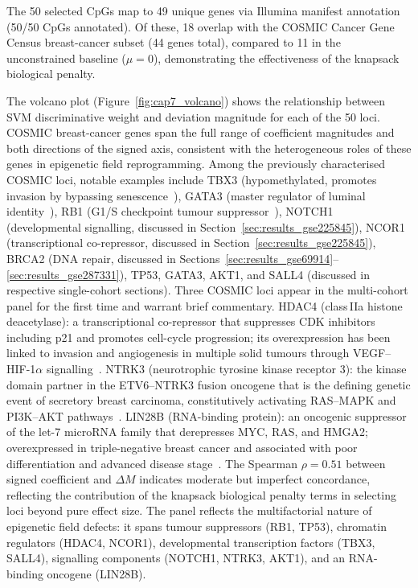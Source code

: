 The 50 selected CpGs map to 49 unique genes via Illumina manifest
annotation (50/50 CpGs annotated).
Of these, 18 overlap with the COSMIC Cancer Gene Census breast-cancer subset
(44 genes total), compared to 11 in the unconstrained baseline ($\mu = 0$),
demonstrating the effectiveness of the knapsack biological penalty.

The volcano plot (Figure~\ref{fig:cap7_volcano}) shows the relationship between
SVM discriminative weight and deviation magnitude for each of the 50 loci.
COSMIC breast-cancer genes span the full range of coefficient magnitudes and
both directions of the signed axis, consistent with the heterogeneous roles of
these genes in epigenetic field reprogramming.
Among the previously characterised COSMIC loci, notable examples include
TBX3 (hypomethylated, promotes invasion by bypassing senescence~\cite{fillmore2010tbx3}),
GATA3 (master regulator of luminal identity~\cite{asselin2007gata3}),
RB1 (G1/S checkpoint tumour suppressor~\cite{cancer2012comprehensive}),
NOTCH1 (developmental signalling, discussed in Section~\ref{sec:results_gse225845}),
NCOR1 (transcriptional co-repressor, discussed in Section~\ref{sec:results_gse225845}),
BRCA2 (DNA repair, discussed in Sections~\ref{sec:results_gse69914}--\ref{sec:results_gse287331}),
TP53, GATA3, AKT1, and SALL4 (discussed in respective single-cohort sections).
Three COSMIC loci appear in the multi-cohort panel for the first time and warrant
brief commentary.
HDAC4 (class\,IIa histone deacetylase): a transcriptional co-repressor that
suppresses CDK inhibitors including p21 and promotes cell-cycle progression;
its overexpression has been linked to invasion and angiogenesis in multiple
solid tumours through VEGF--HIF-1$\alpha$ signalling~\cite{DiGiorgio2023}.
NTRK3 (neurotrophic tyrosine kinase receptor 3): the kinase domain partner in
the ETV6--NTRK3 fusion oncogene that is the defining genetic event of secretory
breast carcinoma, constitutively activating RAS--MAPK and PI3K--AKT
pathways~\cite{tognon2002etv6}.
LIN28B (RNA-binding protein): an oncogenic suppressor of the let-7
microRNA family that derepresses MYC, RAS, and HMGA2; overexpressed in
triple-negative breast cancer and associated with poor differentiation and
advanced disease stage~\cite{Piskounova2011,Xie2014}.
The Spearman $\rho = 0.51$ between signed coefficient and $\Delta M$ indicates
moderate but imperfect concordance, reflecting the contribution of the knapsack
biological penalty terms in selecting loci beyond pure effect size.
The panel reflects the multifactorial nature of epigenetic field defects: it spans tumour suppressors (RB1, TP53), chromatin regulators (HDAC4, NCOR1), developmental transcription factors (TBX3, SALL4), signalling components (NOTCH1, NTRK3, AKT1), and an RNA-binding oncogene (LIN28B).

